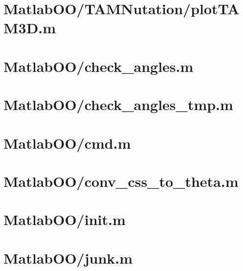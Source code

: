 \pagebreak
\section{MatlabOO/TAMNutation/plotTAM3D.m}\label{code:MatlabOO/TAMNutation/plotTAM3D.m}


\pagebreak
\section{MatlabOO/check\_angles.m}\label{code:MatlabOO/check_angles.m}


\pagebreak
\section{MatlabOO/check\_angles\_tmp.m}\label{code:MatlabOO/check_angles_tmp.m}


\pagebreak
\section{MatlabOO/cmd.m}\label{code:MatlabOO/cmd.m}


\pagebreak
\section{MatlabOO/conv\_css\_to\_theta.m}\label{code:MatlabOO/conv_css_to_theta.m}


\pagebreak
\section{MatlabOO/init.m}\label{code:MatlabOO/init.m}


\pagebreak
\section{MatlabOO/junk.m}\label{code:MatlabOO/junk.m}


